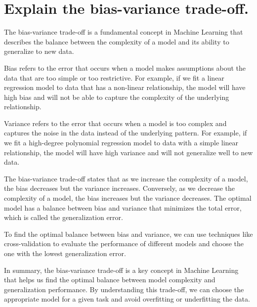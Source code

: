 \section{Explain the bias-variance trade-off.}
The bias-variance trade-off is a fundamental concept in Machine Learning that describes the balance between the complexity of a model and its ability to generalize to new data.

Bias refers to the error that occurs when a model makes assumptions about the data that are too simple or too restrictive. For example, if we fit a linear regression model to data that has a non-linear relationship, the model will have high bias and will not be able to capture the complexity of the underlying relationship.

Variance refers to the error that occurs when a model is too complex and captures the noise in the data instead of the underlying pattern. For example, if we fit a high-degree polynomial regression model to data with a simple linear relationship, the model will have high variance and will not generalize well to new data.

The bias-variance trade-off states that as we increase the complexity of a model, the bias decreases but the variance increases. Conversely, as we decrease the complexity of a model, the bias increases but the variance decreases. The optimal model has a balance between bias and variance that minimizes the total error, which is called the generalization error.

To find the optimal balance between bias and variance, we can use techniques like cross-validation to evaluate the performance of different models and choose the one with the lowest generalization error.

In summary, the bias-variance trade-off is a key concept in Machine Learning that helps us find the optimal balance between model complexity and generalization performance. By understanding this trade-off, we can choose the appropriate model for a given task and avoid overfitting or underfitting the data.

